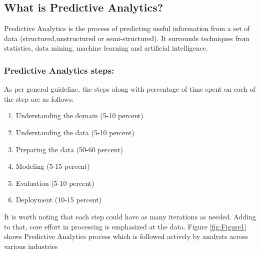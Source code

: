 \documentclass[runningheads]{llncs}
\begin{document}
\subsection{What is Predictive Analytics?}
Predictive Analytics is the process of predicting useful information from a set of data (structured,unstructured or semi-structured).
It surrounds techniques from statistics, data mining, machine learning and artificial intelligence.\vspace{-2mm}

\subsubsection{Predictive Analytics steps:}As per general guideline, the steps along with percentage of time spent on each of the step are as follows: \newline
\begin{enumerate}
	\item Understanding the domain (5-10 percent)
	\item Understanding the data (5-10 percent)
	\item Preparing the data (50-60 percent)
	\item Modeling (5-15 percent)
	\item Evaluation (5-10 percent)
	\item Deployment (10-15 percent)
\end{enumerate} 
It is worth noting that each step could have as many iterations as needed. Adding to that, core effort in processing is emphasized at the data.\newline
Figure \ref{fig:Figure1} shows Predictive Analytics process which is followed actively by analysts across various industries \cite{6}
\end{document}

